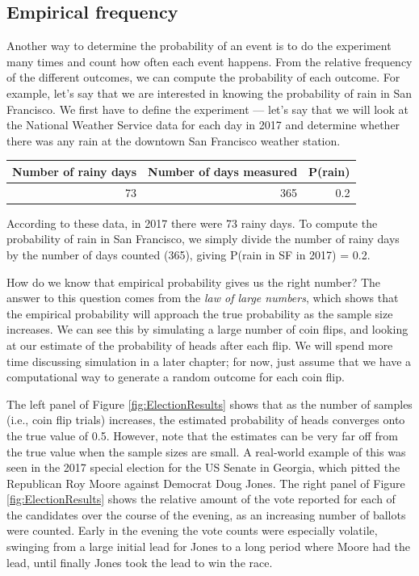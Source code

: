 \documentclass[12pt,]{book}
\theoremstyle{definition}
\theoremstyle{definition}
\theoremstyle{definition}
\theoremstyle{remark}
\begin{document}
\hypertarget{empirical-frequency}{%
\subsection{Empirical frequency}\label{empirical-frequency}}

Another way to determine the probability of an event is to do the experiment many times and count how often each event happens. From the relative frequency of the different outcomes, we can compute the probability of each outcome. For example, let's say that we are interested in knowing the probability of rain in San Francisco. We first have to define the experiment --- let's say that we will look at the National Weather Service data for each day in 2017 and determine whether there was any rain at the downtown San Francisco weather station.

\begin{tabular}{r|r|r}
\hline
Number of rainy days & Number of days measured & P(rain)\\
\hline
73 & 365 & 0.2\\
\hline
\end{tabular}

According to these data, in 2017 there were 73 rainy days. To compute the probability of rain in San Francisco, we simply divide the number of rainy days by the number of days counted (365), giving P(rain in SF in 2017) = 0.2.

How do we know that empirical probability gives us the right number? The answer to this question comes from the \emph{law of large numbers}, which shows that the empirical probability will approach the true probability as the sample size increases. We can see this by simulating a large number of coin flips, and looking at our estimate of the probability of heads after each flip. We will spend more time discussing simulation in a later chapter; for now, just assume that we have a computational way to generate a random outcome for each coin flip.

The left panel of Figure \ref{fig:ElectionResults} shows that as the number of samples (i.e., coin flip trials) increases, the estimated probability of heads converges onto the true value of 0.5. However, note that the estimates can be very far off from the true value when the sample sizes are small. A real-world example of this was seen in the 2017 special election for the US Senate in Georgia, which pitted the Republican Roy Moore against Democrat Doug Jones. The right panel of Figure \ref{fig:ElectionResults} shows the relative amount of the vote reported for each of the candidates over the course of the evening, as an increasing number of ballots were counted. Early in the evening the vote counts were especially volatile, swinging from a large initial lead for Jones to a long period where Moore had the lead, until finally Jones took the lead to win the race.
\end{document}
